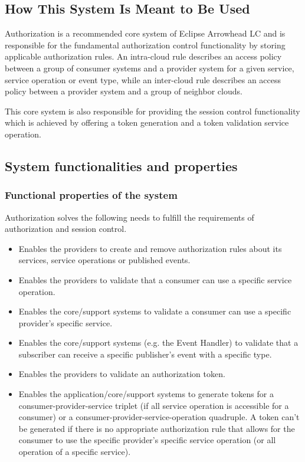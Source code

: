 \documentclass[a4paper]{arrowhead}
\begin{document}
\subsection{How This System Is Meant to Be Used}
\label{sec:use}

Authorization is a recommended core system of Eclipse Arrowhead LC and is responsible for the fundamental authorization control functionality by storing applicable authorization rules. An intra-cloud rule describes an access policy between a group of consumer systems and a provider system for a given service, service operation or event type, while an inter-cloud rule describes an access policy between a provider system and a group of neighbor clouds.

This core system is also responsible for providing the session control functionality which is achieved by offering a token generation and a token validation service operation. 

\subsection{System functionalities and properties}
\label{sec:properties}

\subsubsection {Functional properties of the system}

Authorization solves the following needs to fulfill the requirements of authorization and session control.

\begin{itemize}
    \item Enables the providers to create and remove authorization rules about its services, service operations or published events.
    \item Enables the providers to validate that a consumer can use a specific service operation.
    \item Enables the core/support systems to validate a consumer can use a specific provider's specific service.
    \item Enables the core/support systems (e.g. the Event Handler) to validate that a subscriber can receive a specific publisher's event with a specific type.
    \item Enables the providers to validate an authorization token.
    \item Enables the application/core/support systems to generate tokens for a consumer-provider-service triplet (if all service operation is accessible for a consumer) or a consumer-provider-service-operation quadruple.
    A token can't be generated if there is no appropriate authorization rule that allows for the consumer to use the specific provider's specific service operation (or all operation of a specific service). 
\end{itemize}
\end{document}

